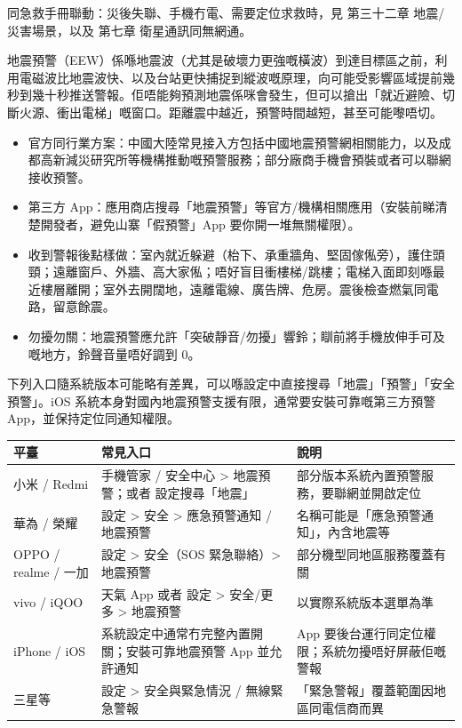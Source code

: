 同急救手冊聯動：災後失聯、手機冇電、需要定位求救時，見 第三十二章 地震/災害場景，以及 第七章 衛星通訊同無網通。


地震預警（EEW）係喺地震波（尤其是破壞力更強嘅橫波）到達目標區之前，利用電磁波比地震波快、以及台站更快捕捉到縱波嘅原理，向可能受影響區域提前幾秒到幾十秒推送警報。佢唔能夠預測地震係咪會發生，但可以搶出「就近避險、切斷火源、衝出電梯」嘅窗口。距離震中越近，預警時間越短，甚至可能嚟唔切。

\begin{itemize}
  \item 官方同行業方案：中國大陸常見接入方包括中國地震預警網相關能力，以及成都高新減災研究所等機構推動嘅預警服務；部分廠商手機會預裝或者可以聯網接收預警。
  \item 第三方 App：應用商店搜尋「地震預警」等官方/機構相關應用（安裝前睇清楚開發者，避免山寨「假預警」App 要你開一堆無關權限）。
  \item 收到警報後點樣做：室內就近躲避（枱下、承重牆角、堅固傢俬旁），護住頭頸；遠離窗戶、外牆、高大家俬；唔好盲目衝樓梯/跳樓；電梯入面即刻喺最近樓層離開；室外去開闊地，遠離電線、廣告牌、危房。震後檢查燃氣同電路，留意餘震。
  \item 勿擾勿關：地震預警應允許「突破靜音/勿擾」響鈴；瞓前將手機放伸手可及嘅地方，鈴聲音量唔好調到 0。
\end{itemize}


下列入口隨系統版本可能略有差異，可以喺設定中直接搜尋「地震」「預警」「安全預警」。iOS 系統本身對國內地震預警支援有限，通常要安裝可靠嘅第三方預警 App，並保持定位同通知權限。

\begin{center}
\begin{tabularx}{\linewidth}{|X|X|X|}
\hline
\textbf{平臺} & \textbf{常見入口} & \textbf{說明} \tabularnewline
\hline
小米 / Redmi & 手機管家 / 安全中心 > 地震預警；或者 設定搜尋「地震」 & 部分版本系統內置預警服務，要聯網並開啟定位 \tabularnewline
華為 / 榮耀 & 設定 > 安全 > 應急預警通知 / 地震預警 & 名稱可能是「應急預警通知」，內含地震等 \tabularnewline
OPPO / realme / 一加 & 設定 > 安全（SOS 緊急聯絡）> 地震預警 & 部分機型同地區服務覆蓋有關 \tabularnewline
vivo / iQOO & 天氣 App 或者 設定 > 安全/更多 > 地震預警 & 以實際系統版本選單為準 \tabularnewline
iPhone / iOS & 系統設定中通常冇完整內置開關；安裝可靠地震預警 App 並允許通知 & App 要後台運行同定位權限；系統勿擾唔好屏蔽佢嘅警報 \tabularnewline
三星等 & 設定 > 安全與緊急情況 / 無線緊急警報 & 「緊急警報」覆蓋範圍因地區同電信商而異 \tabularnewline
\hline
\end{tabularx}
\end{center}

